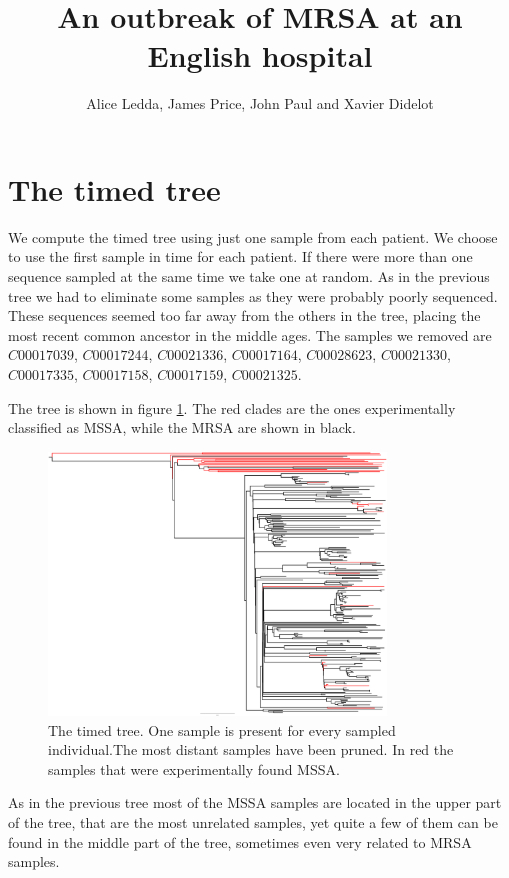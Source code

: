 \documentclass[12pt,a4paper]{article}
\title{An outbreak of MRSA at an English hospital}
\author{Alice Ledda, James Price, John Paul and Xavier Didelot}
\begin{document}
\maketitle
\section{The timed tree}
We compute the timed tree using just one sample from each patient. We choose to use the first sample in time for each patient. If there were more than one sequence sampled at the same time we take one at random. As in the previous tree we had to eliminate some samples as they were probably poorly sequenced. These sequences seemed too far away from the others in the tree, placing the most recent common ancestor in the middle ages. The samples we removed are $C00017039$, $C00017244$, $C00021336$, $C00017164$, $C00028623$, $C00021330$, $C00017335$, $C00017158$, $C00017159$, $C00021325$.

The tree is shown in figure \ref{MRSAtree}. The red clades are the ones experimentally classified as MSSA, while the MRSA are shown in black. 

\begin{figure}[hb]
  \centering
  \includegraphics[width=0.8\textwidth]{treeMRSA.pdf}
  \caption[Tree]
   {The timed tree. One sample is present for every sampled individual.The most distant samples have been pruned. In red the samples that were experimentally found MSSA.}\label{MRSAtree}
\end{figure}

As in the previous tree most of the MSSA samples are located in the upper part of the tree, that are the most unrelated samples, yet quite a few of them can be found in the middle part of the tree, sometimes even very related to MRSA samples.
\end{document}
